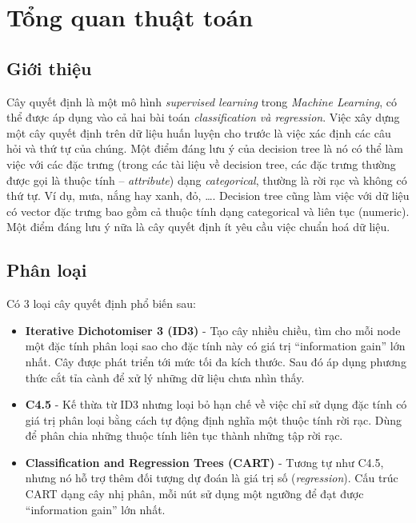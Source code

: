 \documentclass[../main-report.tex]{subfiles}
\begin{document}
\section{Tổng quan thuật toán}
\subsection{Giới thiệu}
Cây quyết định là một mô hình \textit{supervised learning} trong \textit{Machine Learning}, có thể được áp dụng vào cả hai bài toán \textit{classification và regression}. Việc xây dựng một cây quyết định trên dữ liệu huấn luyện cho trước là việc xác định các câu hỏi và thứ tự của chúng. Một điểm đáng lưu ý của decision tree là nó có thể làm việc với các đặc trưng (trong các tài liệu về decision tree, các đặc trưng thường được gọi là thuộc tính – \textit{attribute}) dạng \textit{categorical}, thường là rời rạc và không có thứ tự. Ví dụ, mưa, nắng hay xanh, đỏ, \ldots. Decision tree cũng làm việc với dữ liệu có vector đặc trưng bao gồm cả thuộc tính dạng categorical và liên tục (numeric). Một điểm đáng lưu ý nữa là cây quyết định ít yêu cầu việc chuẩn hoá dữ liệu.

\subsection{Phân loại}
Có 3 loại cây quyết định phổ biến sau:

\begin{itemize}
\item \textbf{Iterative Dichotomiser 3 (ID3)} - Tạo cây nhiều chiều, tìm cho mỗi node một đặc tính phân loại sao cho đặc tính này có giá trị ``information gain'' lớn nhất. Cây được phát triển tới mức tối đa kích thước. Sau đó áp dụng phương thức cắt tỉa cành để xử lý những dữ liệu chưa nhìn thấy.
\item \textbf{C4.5} - Kế thừa từ ID3 nhưng loại bỏ hạn chế về việc chỉ sử dụng đặc tính có giá trị phân loại bằng cách tự động định nghĩa một thuộc tính rời rạc. Dùng để phân chia những thuộc tính liên tục thành những tập rời rạc.
\item \textbf{Classification and Regression Trees (CART)} - Tương tự như C4.5, nhưng nó hỗ trợ thêm đối tượng dự đoán là giá trị số (\emph{\gls{regression}}). Cấu trúc CART dạng cây nhị phân, mỗi nút sử dụng một ngưỡng để đạt được ``information gain'' lớn nhất.
\end{itemize}

%
\end{document}
